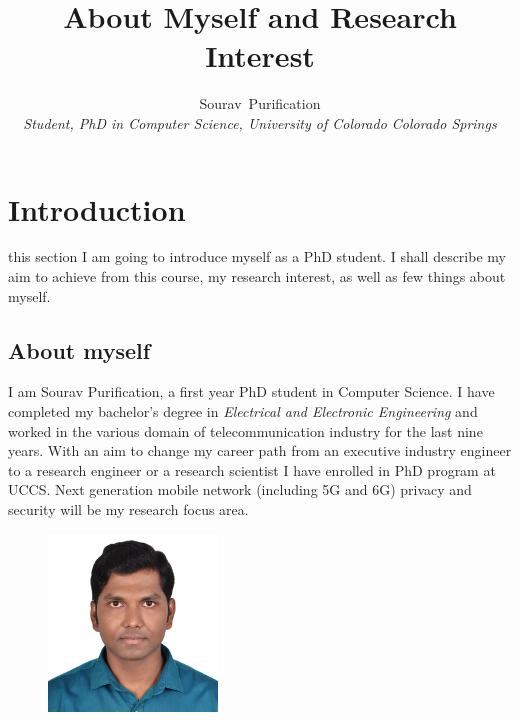 \documentclass[journal]{IEEEtran}
\begin{document}
\title{About Myself and Research Interest}


\author{Sourav~Purification \\ \textit{Student, PhD in Computer Science, University of Colorado Colorado Springs}}


\maketitle


\section{Introduction}

 this section I am going to introduce myself as a PhD student. I shall describe my aim to achieve from this course, my research interest, as well as few things about myself.


\subsection{About myself}
I am Sourav Purification, a first year PhD student in Computer Science. I have completed my bachelor's degree in \textit{Electrical and Electronic Engineering} and worked in the various domain of telecommunication industry for the last nine years. With an aim to change my career path from an executive industry engineer to a research engineer or a research scientist I have enrolled in PhD program at UCCS. Next generation mobile network (including 5G and 6G) privacy and security will be my research focus area.

\begin{figure}[h]
    \centering
    \includegraphics[width=0.4\textwidth]{Sourav.png}
\end{figure}
\end{document}

